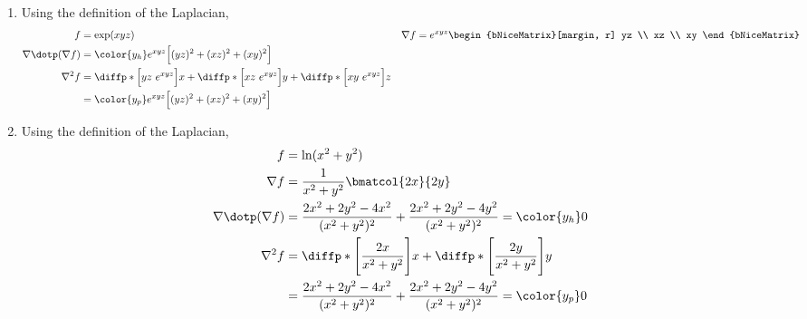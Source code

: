 \begin{enumerate}
    \item Using the definition of the Laplacian,
          \begin{align}
              f                       & = \exp(xyz)                              &
              \nabla f                & = e^{xyz} \begin{bNiceMatrix}[margin, r]
                                                      yz \\ xz \\ xy
                                                  \end{bNiceMatrix}    \\
              \nabla \dotp (\nabla f) & = \color{y_h} e^{xyz}
              \Big[(yz)^2 + (xz)^2 + (xy)^2\Big]                                   \\
              \nabla^2 f              & = \diffp*{\Big[yz\ e^{xyz}\Big]}{x}
              + \diffp*{\Big[xz\ e^{xyz}\Big]}{y}
              + \diffp*{\Big[xy\ e^{xyz}\Big]}{z}                                  \\
                                      & = \color{y_p} e^{xyz}
              \Big[(yz)^2 + (xz)^2 + (xy)^2\Big]
          \end{align}

    \item Using the definition of the Laplacian,
          \begin{align}
              f                       & = \ln(x^2 + y^2)                      \\
              \nabla f                & = \frac{1}{x^2 + y^2}\bmatcol{2x}{2y} \\
              \nabla \dotp (\nabla f) & = \frac{2x^2 + 2y^2 - 4x^2}
              {(x^2 + y^2)^2} + \frac{2x^2 + 2y^2 - 4y^2}
              {(x^2 + y^2)^2} = \color{y_h} 0                                 \\
              \nabla^2 f              & =
              \diffp*{\Bigg[ \frac{2x}{x^2 + y^2} \Bigg]}{x}
              + \diffp*{\Bigg[ \frac{2y}{x^2 + y^2} \Bigg]}{y}                \\
                                      & = \frac{2x^2 + 2y^2 - 4x^2}
              {(x^2 + y^2)^2} + \frac{2x^2 + 2y^2 - 4y^2}
              {(x^2 + y^2)^2} = \color{y_p} 0
          \end{align}


\end{enumerate}
